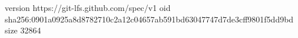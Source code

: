 version https://git-lfs.github.com/spec/v1
oid sha256:0901a0925a8d8782710c2a12c04657ab591bd63047747d7de3cff9801f5dd9bd
size 32864
